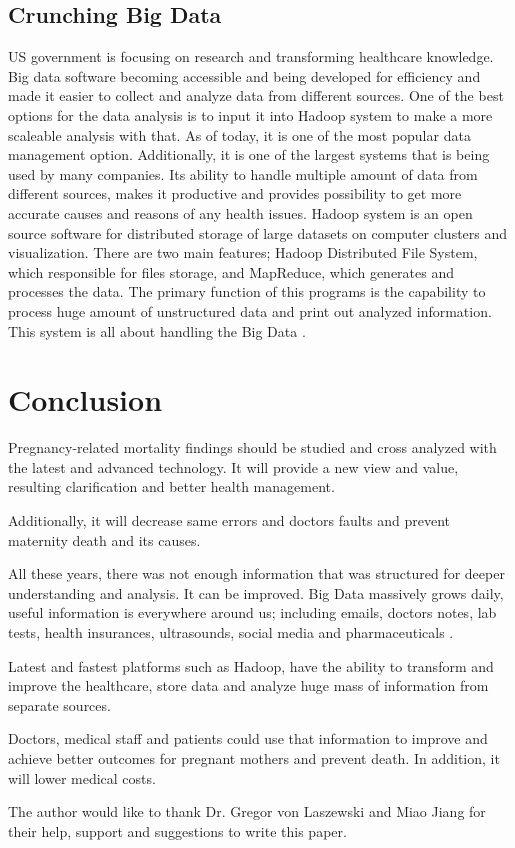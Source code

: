 \documentclass[sigconf]{acmart}
\begin{document}
\subsection{Crunching Big Data}

US government is focusing on research and transforming healthcare knowledge. Big data software becoming accessible and being developed for efficiency and made it easier to collect and analyze data from different sources. One of the best options for the data analysis is to input it into Hadoop system to make a more scaleable analysis with that. As of today, it is one of the most popular data management option. Additionally, it is one of the largest systems that is being used by many companies. Its ability to handle multiple amount of data from different sources, makes it productive and provides possibility to get more accurate causes and reasons of any health issues. Hadoop system is an open source software for distributed storage of large datasets on computer clusters and visualization. There are two main features; Hadoop Distributed File System, which responsible for files storage, and MapReduce, which generates and processes the data. The primary function of this programs is the capability to process huge amount of unstructured data and print out analyzed information. This system is all about handling the Big Data \cite{dittrich2012efficient}.

\section{Conclusion}

Pregnancy-related mortality findings should be studied and cross analyzed with the latest and advanced technology. It will provide a new view and value, resulting clarification and better health management. 

Additionally, it will decrease same errors and doctors faults and prevent maternity death and its causes.

All these years, there was not enough information that was structured for deeper understanding and analysis. It can be improved. Big Data massively grows daily, useful information is everywhere around us; including emails, doctor\textquotesingle s notes, lab tests, health insurances, ultrasounds, social media and pharmaceuticals .

Latest and fastest platforms such as Hadoop, have the ability to transform and improve the healthcare, store data and analyze huge mass of information from separate sources.

Doctors, medical staff and patients could use that information to improve and achieve better outcomes for pregnant mothers and prevent death. 
In addition, it will lower medical costs.


\begin{acks}

  The author would like to thank Dr. Gregor von Laszewski and Miao Jiang for their help, support and suggestions to write this paper.

\end{acks}


 


\end{document}
